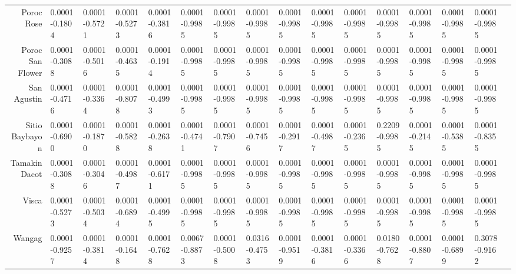 \documentclass[11pt]{article}
\begin{document}
\begin{tabular}{r|lllllllllllllll}
	 Poroc Rose        & 0.0001-0.1804     & 0.0001-0.5721     & 0.0001-0.5273     & 0.0001-0.3816     & 0.0001-0.9985     & 0.0001-0.9985     & 0.0001-0.9985     & 0.0001-0.9985     & 0.0001-0.9985     & 0.0001-0.9985     & 0.0001-0.9985     & 0.0001-0.9985     & 0.0001-0.9985     & 0.0001-0.9985    \\
	 Poroc San Flower  & 0.0001-0.3088     & 0.0001-0.5016     & 0.0001-0.4635     & 0.0001-0.1914     & 0.0001-0.9985     & 0.0001-0.9985     & 0.0001-0.9985     & 0.0001-0.9985     & 0.0001-0.9985     & 0.0001-0.9985     & 0.0001-0.9985     & 0.0001-0.9985     & 0.0001-0.9985     & 0.0001-0.9985    \\
	 San Agustin       & 0.0001-0.4716     & 0.0001-0.3364     & 0.0001-0.8078     & 0.0001-0.4993     & 0.0001-0.9985     & 0.0001-0.9985     & 0.0001-0.9985     & 0.0001-0.9985     & 0.0001-0.9985     & 0.0001-0.9985     & 0.0001-0.9985     & 0.0001-0.9985     & 0.0001-0.9985     & 0.0001-0.9985    \\
	 Sitio Baybayon    & 0.0001-0.6900     & 0.0001-0.1870     & 0.0001-0.5828     & 0.0001-0.2638     & 0.0001-0.4741     & 0.0001-0.7907     & 0.0001-0.7456     & 0.0001-0.2917     & 0.0001-0.4987     & 0.0001-0.2365     & 0.2209-0.9985     & 0.0001-0.2145     & 0.0001-0.5385     & 0.0001-0.8355    \\
	 Tamakin Dacot     & 0.0001-0.3088     & 0.0001-0.3046     & 0.0001-0.4987     & 0.0001-0.6171     & 0.0001-0.9985     & 0.0001-0.9985     & 0.0001-0.9985     & 0.0001-0.9985     & 0.0001-0.9985     & 0.0001-0.9985     & 0.0001-0.9985     & 0.0001-0.9985     & 0.0001-0.9985     & 0.0001-0.9985    \\
	 Visca             & 0.0001-0.5273     & 0.0001-0.5034     & 0.0001-0.6894     & 0.0001-0.4995     & 0.0001-0.9985     & 0.0001-0.9985     & 0.0001-0.9985     & 0.0001-0.9985     & 0.0001-0.9985     & 0.0001-0.9985     & 0.0001-0.9985     & 0.0001-0.9985     & 0.0001-0.9985     & 0.0001-0.9985    \\
	 Wangag            & 0.0001-0.9257     & 0.0001-0.3814     & 0.0001-0.1648     & 0.0001-0.7628     & 0.0067-0.8873     & 0.0001-0.5008     & 0.0316-0.4753     & 0.0001-0.9519     & 0.0001-0.3816     & 0.0001-0.3366     & 0.0180-0.7628     & 0.0001-0.8807     & 0.0001-0.6899     & 0.3078-0.9162    \\
\end{tabular}
\end{document}
